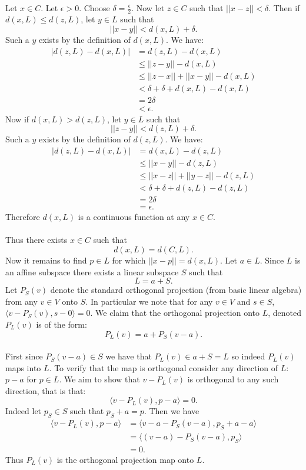 \documentclass[letterpaper,12pt,oneside,onecolumn]{article}
\begin{document}
\paragraph{}
Let $x \in C$. Let $\epsilon > 0$. Choose $\delta = \frac{\epsilon}{2}$. Now let $z \in C$ such that $||x - z || < \delta$. Then if $d(x,L) \leq d(z,L)$, let $y \in L$ such that $$||x-y|| < d(x,L) + \delta.$$
Such a $y$ exists by the definition of $d(x,L)$. We have:
\begin{align*}
|d(z,L) - d(x,L)|  &= d(z,L) - d(x,L) \\
&\leq ||z-y|| - d(x,L) \\
&\leq ||z-x|| + ||x-y|| - d(x,L) \\
&< \delta + \delta + d(x,L) - d(x,L) \\
&= 2\delta \\
&< \epsilon.
\end{align*}
Now if $d(x,L) > d(z,L)$, let $y \in L$ such that $$||z-y|| < d(z,L) + \delta.$$
Such a $y$ exists by the definition of $d(z,L)$. We have:
\begin{align*}
|d(z,L) - d(x,L)| &= d(x,L) - d(z,L) \\
&\leq ||x-y|| - d(z,L) \\
&\leq ||x-z|| + ||y-z|| - d(z,L) \\
&< \delta + \delta + d(z,L) - d(z,L) \\
&= 2\delta \\
&= \epsilon.
\end{align*}
Therefore $d(x,L)$ is a continuous function at any $x\in C$.
\paragraph{}
Thus there exists $x \in C$ such that $$ d(x,L) = d(C,L).$$ Now it remains to find $p \in L$ for which $||x - p || = d(x,L)$. Let $a \in L$. Since $L$ is an affine subspace there exists a linear subspace $S$ such that $$ L = a + S.$$
Let $P_S(v)$ denote the standard orthogonal projection (from basic linear algebra) from any $v \in V$ onto $S$. In particular we note that for any $v \in V$ and $s \in S$, $\langle v - P_S(v), s - 0 \rangle = 0$. We claim that the orthogonal projection onto $L$, denoted $P_L(v)$ is of the form:
$$P_L(v) = a + P_S(v-a).$$
\paragraph{}
First since $P_S(v-a) \in S$ we have that $P_L(v) \in a + S = L$ so indeed $P_L(v)$ maps into $L$. To verify that the map is orthogonal consider any direction of $L$: $p -a$ for $p \in L$. We aim to show that $v - P_L(v)$ is orthogonal to any such direction, that is that:
$$\langle v - P_L(v), p -a \rangle = 0.$$
Indeed  let $p_S \in S$ such that $p_S + a = p$. Then we have
\begin{align*}
\langle v- P_L(v), p-a \rangle &= \langle v - a - P_S(v-a), p_S + a - a \rangle \\
&= \langle (v-a) - P_S(v-a), p_S \rangle \\
&= 0.
\end{align*}
Thus $P_L(v)$ is the orthogonal projection map onto $L$.
\end{document}
